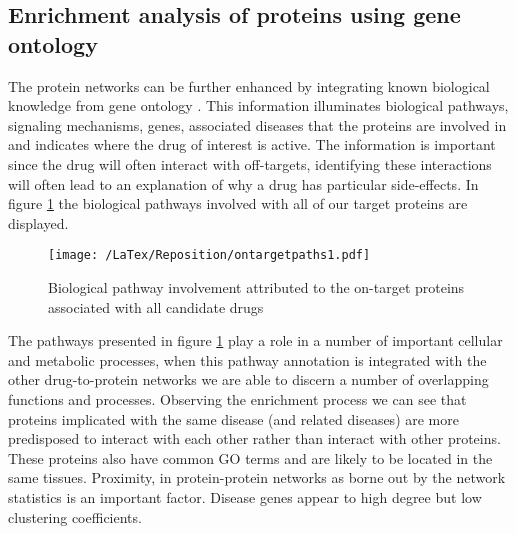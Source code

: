 \documentclass[preprint,12pt]{elsarticle}
\begin{document}
\subsection{Enrichment analysis of proteins using gene ontology}
The protein networks can be further enhanced by integrating known biological knowledge from gene ontology \cite{Ashburner00, Deng04}. This information illuminates biological pathways, signaling mechanisms, genes, associated diseases that the proteins are involved in and indicates where the drug of interest is active.  The information is important since the drug will often interact with off-targets, identifying these interactions will often lead to an explanation of why a drug has particular side-effects. In figure \ref{pathway1} the biological pathways involved with all of our target proteins are displayed.

\begin{figure}[h]
  \begin{center}
	 \texttt{[image: /LaTex/Reposition/ontargetpaths1.pdf]} %
   \end{center}
 \caption{Biological pathway involvement attributed to the on-target proteins associated with all candidate drugs}
\label{pathway1}
\end{figure}

The pathways presented in figure \ref{pathway1} play a role in a number of important cellular and metabolic processes, when this pathway annotation is integrated with the other drug-to-protein networks we are able to discern a number of overlapping functions and processes. Observing the enrichment process we can see that proteins implicated with the same disease (and related diseases) are more predisposed to interact with each other rather than interact with other proteins. These proteins also have common GO terms and are likely to be located in the same tissues. Proximity, in protein-protein networks as borne out by the network statistics is an important factor. Disease genes appear to high degree but low clustering coefficients.
\end{document}
